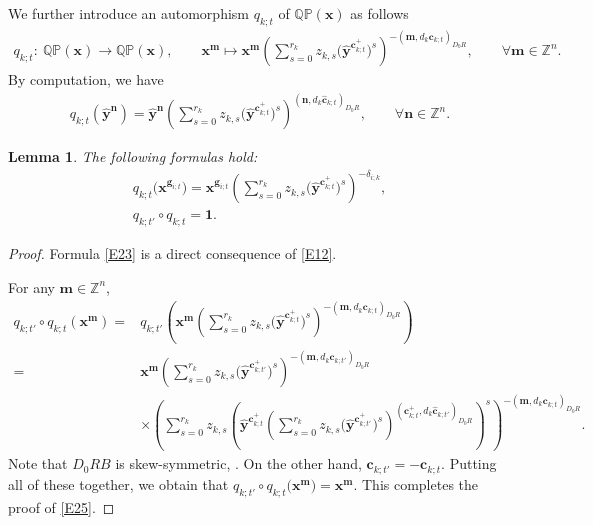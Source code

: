 \documentclass[10pt,a4paper]{amsart}
\newcommand{\id}{\mathbf{1}}
\numberwithin{equation}{section}
\newtheorem{Lemma}[Theorem]{Lemma}
\begin{document}
We further introduce an automorphism $q_{k;t}$ of $\mathbb{QP}(\mathbf{x})$ as follows
\begin{align*}
 q_{k;t}\colon\
 \mathbb{QP}(\mathbf{x})\longrightarrow\mathbb{QP}(\mathbf{x}),\qquad
 \mathbf{x}^{\mathbf{m}}\longmapsto\mathbf{x}^{\mathbf{m}}\left(\sum\limits_{s=0}^{r_k}z_{k,s}\bigl(\hat{\mathbf{y}}^{\mathbf{c}_{k;t}^+}\bigr)^s\right)^{-(\mathbf{m},d_{k}\mathbf{c}_{k;t})_{D_0R}},\qquad \forall \mathbf{m} \in\mathbb{Z}^n.
\end{align*}
By computation, we have
\begin{align}
 q_{k;t}(\hat{\mathbf{y}}^{\mathbf{n}})=\hat{\mathbf{y}}^{\mathbf{n}}
 \left(\sum\limits_{s=0}^{r_k}z_{k,s}\bigl(\hat{\mathbf{y}}^{\mathbf{c}_{k;t}^+}\bigr)^s\right)^{(\mathbf{n},d_{k}\mathbf{\hat{c}}_{k;t})_{D_0R}},\qquad \forall \mathbf{n}\in\mathbb{Z}^n.\label{E22}
\end{align}
\begin{Lemma}\label{P10}
The following formulas hold:
 \begin{gather}
  q_{k;t}\bigl(\mathbf{x}^{\mathbf{g}_{i;t}}\bigr)=\mathbf{x}^{\mathbf{g}_{i;t}}\left(\sum\limits_{s=0}^{r_k}z_{k,s}\bigl(\hat{\mathbf{y}}^{\mathbf{c}_{k;t}^+}\bigr)^s\right)^{-\delta_{i;k}},\label{E23}\\
  q_{k;t'}\circ q_{k;t}=\id. \label{E25}
 \end{gather}
\end{Lemma}
\begin{proof}
Formula \eqref{E23} is a direct consequence of \eqref{E12}.


 For any $\mathbf{m}\in\mathbb{Z}^n$,
 \begin{align*}
 q_{k;t'}\circ q_{k;t}(\mathbf{x}^{\mathbf{m}})={}&q_{k;t'}
 \left(\mathbf{x}^{\mathbf{m}}\left(\sum\limits_{s=0}^{r_k}z_{k,s}\bigl(\hat{\mathbf{y}}^{\mathbf{c}_{k;t}^+}\bigr)^s\right)^{-(\mathbf{m},d_{k}\mathbf{c}_{k;t})_{D_0R}}\right)\\
 ={}&\mathbf{x}^{\mathbf{m}}\left(\sum\limits_{s=0}^{r_k}z_{k,s}\bigl(\hat{\mathbf{y}}^{\mathbf{c}_{k;t'}^+}\bigr)^s\right)^{-(\mathbf{m},d_{k}\mathbf{c}_{k;t'})_{D_0R}}\\
 &\times\left(\sum\limits_{s=0}^{r_k}z_{k,s}\left(\hat{\mathbf{y}}^{\mathbf{c}_{k;t}^+}
 \left(\sum\limits_{s=0}^{r_k}z_{k,s}\bigl(\hat{\mathbf{y}}^{\mathbf{c}_{k;t'}^+}\bigr)^s\right)^{(\mathbf{c}_{k;t}^+,d_k\mathbf{\hat{c}}_{k;t'})_{D_0R}}\right)^s\right)^{-(\mathbf{m},d_k\mathbf{c}_{k;t})_{D_0R}}.
 \end{align*}
 Note that $D_0RB$ is skew-symmetric, . On the other hand, $\mathbf{c}_{k;t'}=-\mathbf{c}_{k;t}$. Putting all of these together, we obtain that
 $
 q_{k;t'}\circ q_{k;t}\bigl(\mathbf{x}^\mathbf{m}\bigr)=\mathbf{x}^\mathbf{m}$.
 This completes the proof of \eqref{E25}.
\end{proof}
\end{document}
